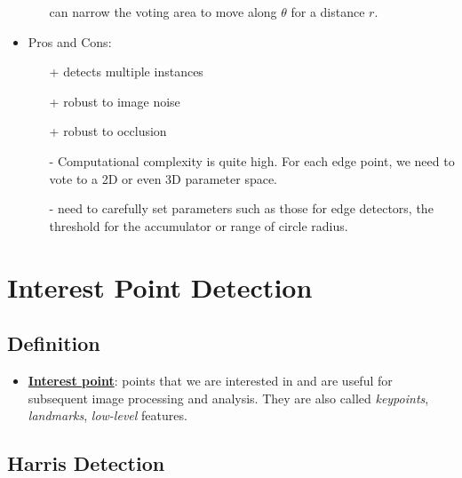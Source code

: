 \documentclass[twocolumn,landscape,10pt]{article}
\theoremstyle{definition}
\begin{document}
\begin{itemize}
\begin{itemize}
                can narrow the voting area to move along $\theta$ for a distance
                $r$.
        \end{itemize} 
    \item Pros and Cons:
        \begin{itemize}
            \item[+] detects multiple instances
            \item[+] robust to image noise
            \item[+] robust to occlusion
            \item[-] Computational complexity is quite high. For each edge
                point, we need to vote to a 2D or even 3D parameter space.
            \item[-] need to carefully set parameters such as those for edge
                detectors, the threshold for the accumulator or range of circle
                radius.
        \end{itemize} 
\end{itemize} 


\section{Interest Point Detection}

\subsection{Definition}

\begin{itemize}
    \item \underline{\textbf{Interest point}}: points that we are interested in
        and are useful for subsequent image processing and analysis.
        They are also called \emph{keypoints}, \emph{landmarks},
        \emph{low-level} features.
\end{itemize} 

\subsection{Harris Detection}
\end{document}
